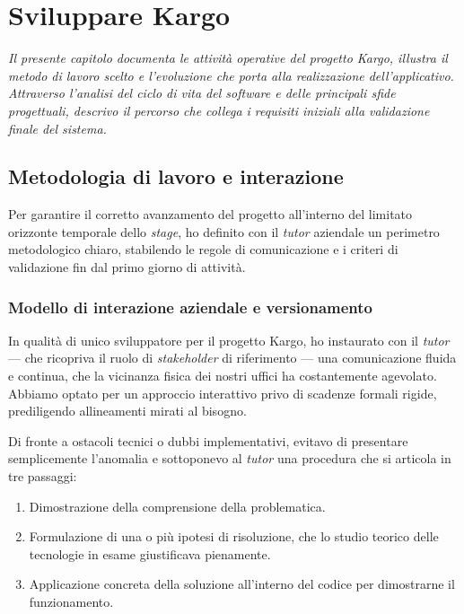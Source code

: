 \chapter{Sviluppare Kargo}
\label{chap:progettazione-codifica}

\textit{Il presente capitolo documenta le attività operative del progetto Kargo, illustra il metodo di lavoro scelto e l'evoluzione che porta alla realizzazione dell'applicativo. Attraverso l'analisi del ciclo di vita del software e delle principali sfide progettuali, descrivo il percorso che collega i requisiti iniziali alla validazione finale del sistema.}

\section{Metodologia di lavoro e interazione}
\label{sec:metodologia_lavoro}

Per garantire il corretto avanzamento del progetto all'interno del limitato orizzonte temporale dello \textit{stage}, ho definito con il \textit{tutor} aziendale un perimetro metodologico chiaro, stabilendo le regole di comunicazione e i criteri di validazione fin dal primo giorno di attività.

\subsection{Modello di interazione aziendale e versionamento}
\label{subsec:interazione_aziendale}

In qualità di unico sviluppatore per il progetto Kargo, ho instaurato con il \textit{tutor} --- che ricopriva il ruolo di \textit{stakeholder} di riferimento --- una comunicazione fluida e continua, che la vicinanza fisica dei nostri uffici ha costantemente agevolato. Abbiamo optato per un approccio interattivo privo di scadenze formali rigide, prediligendo allineamenti mirati al bisogno.

Di fronte a ostacoli tecnici o dubbi implementativi, evitavo di presentare semplicemente l'anomalia e sottoponevo al \textit{tutor} una procedura che si articola in tre passaggi:
\begin{enumerate}
    \item Dimostrazione della comprensione della problematica.
    \item Formulazione di una o più ipotesi di risoluzione, che lo studio teorico delle tecnologie in esame giustificava pienamente.
    \item Applicazione concreta della soluzione all'interno del codice per dimostrarne il funzionamento.
\end{enumerate}


